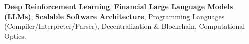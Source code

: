 \textbf{Deep Reinforcement Learning}, \textbf{Financial Large Language Models (LLMs)}, \textbf{Scalable Software Architecture}, Programming Languages (Compiler/Interpreter/Parser), Decentralization \& Blockchain, Computational Optics.